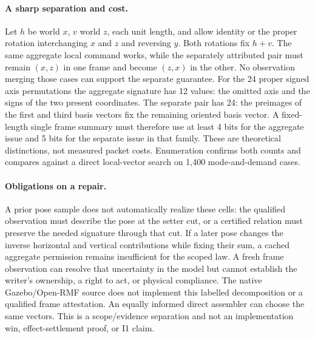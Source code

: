 \documentclass[11pt]{article}
\begin{document}
\paragraph{A sharp separation and cost.}
Let $h$ be world $x$, $v$ world $z$, each unit length, and allow
identity or the proper rotation interchanging $x$ and $z$ and
reversing $y$. Both rotations fix $h+v$. The same aggregate local
command works, while the separately attributed pair must remain
$(x,z)$ in one frame and become $(z,x)$ in the other.
No observation merging those cases can support the separate
guarantee. For the 24 proper signed axis permutations the aggregate
signature has 12 values: the omitted axis and the signs of the
two present coordinates. The separate pair has 24: the preimages
of the first and third basis vectors fix the remaining oriented
basis vector. A fixed-length single frame summary must therefore
use at least 4 bits for the aggregate issue and 5 bits for the
separate issue in that family. These are theoretical distinctions,
not measured packet costs. Enumeration confirms both counts
and compares against a direct local-vector search on 1{,}400
mode-and-demand cases.

\paragraph{Obligations on a repair.}
A prior pose sample does not automatically realize these cells:
the qualified observation must describe the pose at the setter
cut, or a certified relation must preserve the needed signature
through that cut. If a later pose changes the inverse horizontal
and vertical contributions while fixing their sum, a cached
aggregate permission remains insufficient for the scoped law.
A fresh frame observation can resolve that uncertainty in the
model but cannot establish the writer's ownership, a right to
act, or physical compliance. The native Gazebo/Open-RMF source
does not implement this labelled decomposition or a qualified
frame attestation. An equally informed direct assembler can
choose the same vectors. This is a scope/evidence separation and
not an implementation win, effect-settlement proof, or I1 claim.
\end{document}
